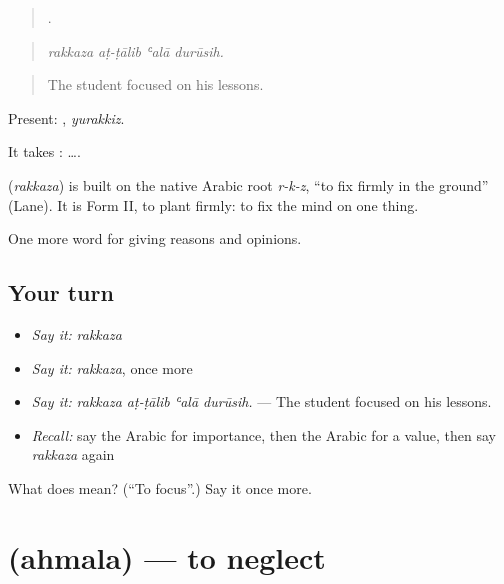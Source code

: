 \begin{quote}
   .
\end{quote}

\begin{quote}
\emph{rakkaza aṭ-ṭālib ʿalā durūsih.}
\end{quote}

\begin{quote}
The student focused on his lessons.
\end{quote}

Present: , \emph{yurakkiz}.

It takes :   ….

\begin{cousinweb}
\textbf{} (\emph{rakkaza}) is built on the native Arabic root \emph{r-k-z}, \textquotedblleft{}to fix firmly in the ground\textquotedblright{} (Lane). It is Form II, to plant firmly: to fix the mind on one thing.
\end{cousinweb}

\begin{grammarlens}[title={What you've built}]
One more word for giving reasons and opinions.
\end{grammarlens}

\subsection*{Your turn}
\begin{itemize}
\raggedright
  \item \emph{Say it:} \emph{rakkaza}
  \item \emph{Say it:} \emph{rakkaza}, once more
  \item \emph{Say it:} \emph{rakkaza aṭ-ṭālib ʿalā durūsih.} — The student focused on his lessons.
  \item \emph{Recall:} say the Arabic for importance, then the Arabic for a value, then say \emph{rakkaza} again
\end{itemize}

\begin{tcolorbox}[breakable,colback=teal!4,colframe=teal!35!black,title={Before you move on}]
What does  mean? (\textquotedblleft{}To focus\textquotedblright{}.) Say it once more.
\end{tcolorbox}
\section[\texorpdfstring{\ar{أهمل} (ahmala)}{أهمل (ahmala)}]{ (ahmala) — to neglect}

